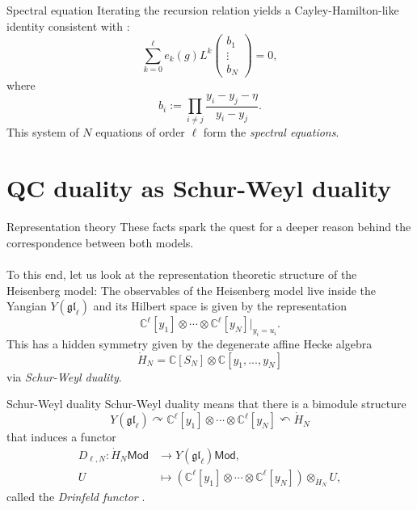 \documentclass[11pt]{beamer}
\theoremstyle{remark}
\theoremstyle{remark}
\newcommand{\C}{\mathbb{C}}
\begin{document}
\begin{frame}{Spectral equation}
Iterating the recursion relation %
yields a Cayley-Hamilton-like identity consistent with \cite{article:gorsky:2014}:
\begin{equation*}
\sum_{k=0}^\ell e_k(g) L^k
\begin{pmatrix}
b_1 \\ \vdots \\ b_N
\end{pmatrix}
= 0,
\end{equation*}
where
\begin{equation*}
b_i := \prod_{i \neq j} \frac{y_i-y_j-\eta}{y_i-y_j}.
\end{equation*}
This system of $N$ equations of order $\ell$ form the \emph{spectral equations}.
\end{frame}

\section{QC duality as Schur-Weyl duality}

\begin{frame}{Representation theory}
These facts spark the quest for a deeper reason behind the correspondence between both models.
\\~\\
To this end, let us look at the representation theoretic structure of the Heisenberg model: The observables of the Heisenberg model live inside the Yangian $Y(\mathfrak{gl}_\ell)$ and its Hilbert space is given by the representation
\begin{equation*}
\C^\ell[y_1] \otimes \cdots \otimes \C^\ell[y_N]|_{y_i=u_i}.
\end{equation*}
This has a hidden symmetry given by the degenerate affine Hecke algebra
\begin{equation*}
\dot H_N = \C[S_N] \otimes \C[y_1,...,y_N]
\end{equation*}
via \emph{Schur-Weyl duality}.
\end{frame}

\begin{frame}{Schur-Weyl duality}
Schur-Weyl duality means that there is a bimodule structure
\begin{equation*}
Y(\mathfrak{gl}_\ell) \curvearrowright \C^\ell[y_1] \otimes \cdots \otimes \C^\ell[y_N] \curvearrowleft \dot H_N
\end{equation*}
that induces a functor
\begin{align*}
D_{\ell,N}: \dot H_N\mathsf{Mod} &\to Y(\mathfrak{gl}_\ell)\mathsf{Mod}, \\
U &\mapsto  (\C^\ell[y_1] \otimes \cdots \otimes \C^\ell[y_N]) \otimes_{\dot H_N} U,
\end{align*}
called the \emph{Drinfeld functor} \cite{article:drinfeld:1986}. %
\end{frame}
\end{document}
